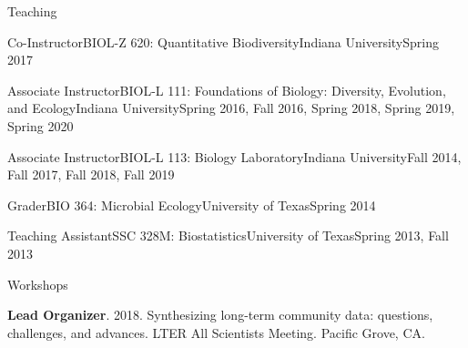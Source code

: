 \documentclass{resume} %
\begin{document}
\begin{rSection}{Teaching}

\begin{Course}
  {Co-Instructor}{BIOL-Z 620: Quantitative Biodiversity}{Indiana University}{Spring 2017}
\end{Course}

\begin{Course}
  {Associate Instructor}{BIOL-L 111: Foundations of Biology: Diversity, Evolution, and Ecology}{Indiana University}{Spring 2016, Fall 2016, Spring 2018, Spring 2019, Spring 2020}
\end{Course}

\begin{Course}
  {Associate Instructor}{BIOL-L 113: Biology Laboratory}{Indiana University}{Fall 2014, Fall 2017, Fall 2018, Fall 2019}
\end{Course}

\begin{Course}
  {Grader}{BIO 364: Microbial Ecology}{University of Texas}{Spring 2014}
\end{Course}

\begin{Course}
  {Teaching Assistant}{SSC 328M: Biostatistics}{University of Texas}{Spring 2013, Fall 2013}
\end{Course}

\end{rSection}

\bigskip


\begin{rSection}{Workshops}

{\bf Lead Organizer}. 2018. Synthesizing long-term community data: questions, challenges, and advances. LTER All Scientists Meeting. Pacific Grove, CA.

\end{rSection}
\bigskip
\end{document}
